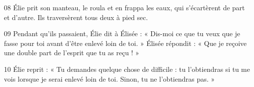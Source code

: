 
08 Élie prit son manteau, le roula et en frappa les eaux, qui s’écartèrent de part et d’autre. Ils traversèrent tous deux à pied sec.

09 Pendant qu’ils passaient, Élie dit à Élisée : « Dis-moi ce que tu veux que je fasse pour toi avant d’être enlevé loin de toi. » Élisée répondit : « Que je reçoive une double part de l’esprit que tu as reçu ! »

10 Élie reprit : « Tu demandes quelque chose de difficile : tu l’obtiendras si tu me vois lorsque je serai enlevé loin de toi. Sinon, tu ne l’obtiendras pas. »
